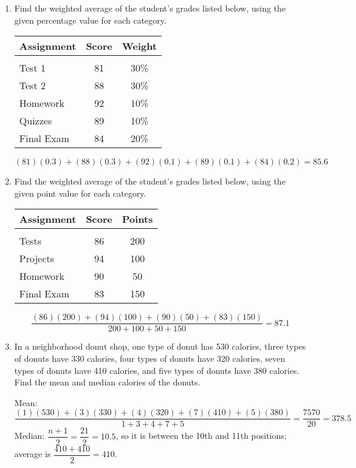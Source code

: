 \begin{enumerate}
\item Find the weighted average of the student's grades listed below, using the given percentage value for each category.
\begin{center}
\begin{tabular}{l c c}
\textbf{Assignment} & \textbf{Score} & \textbf{Weight}\\
\hline
& & \\
Test 1 & 81 & 30\%\\
Test 2 & 88 & 30\%\\
Homework & 92 & 10\%\\
Quizzes & 89 & 10\%\\
Final Exam & 84 & 20\%
\end{tabular}
\end{center}
\text{} 
\[(81)(0.3) + (88)(0.3) + (92)(0.1) + (89)(0.1) + (84)(0.2) = 85.6\]

\item Find the weighted average of the student's grades listed below, using the given point value for each category.
\begin{center}
\begin{tabular}{l c c}
\textbf{Assignment} & \textbf{Score} & \textbf{Points}\\
\hline
& & \\
Tests & 86 & 200\\
Projects & 94 & 100\\
Homework & 90 & 50\\
Final Exam & 83 & 150
\end{tabular}
\end{center}
\text{} 
\[\dfrac{(86)(200) + (94)(100) + (90)(50) + (83)(150)}{200 + 100 + 50 + 150} = 87.1\]

\item In a neighborhood donut shop, one type of donut has 530 calories, three types of donuts have 330 calories, four types of donuts have 320 calories, seven types of donuts have 410 calories, and five types of donuts have 380 calories. Find the mean and median calories of the donuts. 
\begin{center}
Mean: $\dfrac{(1)(530) + (3)(330) + (4)(320) + (7)(410) + (5)(380)}{1 + 3 + 4 + 7 + 5} = \dfrac{7570}{20} = 378.5$\\
Median: $\dfrac{n+1}{2} = \dfrac{21}{2} = 10.5$, so it is between the 10th and 11th positions; average is $\dfrac{410 + 410}{2} = 410$.
\end{center}


\end{enumerate}

